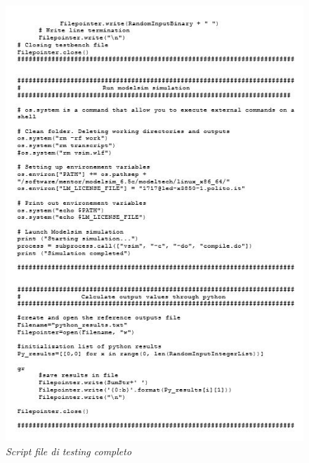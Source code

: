 \begin{figure}[!htb]
	\centering
	\includegraphics[scale=1.2]{immagini/testing2}
	\caption{\textit{Script file di testing completo}}
	\label{testing2}
\end{figure}
\newpage
